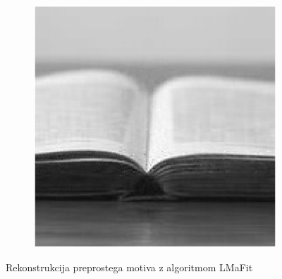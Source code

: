 \begin{figure}
\begin{subfigure}{0.325\linewidth}
    \end{subfigure}
    \hfill
    \begin{subfigure}{0.325\linewidth}
        \includegraphics[width=\linewidth]{Poglavja/Slike/preprosta grayscale 300/rez60LMaFit.png}
    \end{subfigure}
    \caption{Rekonstrukcija preprostega motiva z algoritmom LMaFit}
\end{figure}

